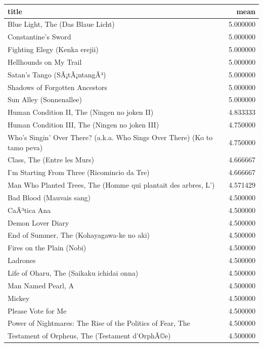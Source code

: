\documentclass[
]{article}
\begin{document}
\begin{table}
\centering\begingroup\fontsize{10}{12}\selectfont

\begin{tabular}{l|r}
\hline
title & mean\\
\hline
Blue Light, The (Das Blaue Licht) & 5.000000\\
\hline
Constantine's Sword & 5.000000\\
\hline
Fighting Elegy (Kenka erejii) & 5.000000\\
\hline
Hellhounds on My Trail & 5.000000\\
\hline
Satan's Tango (SÃ¡tÃ¡ntangÃ³) & 5.000000\\
\hline
Shadows of Forgotten Ancestors & 5.000000\\
\hline
Sun Alley (Sonnenallee) & 5.000000\\
\hline
Human Condition II, The (Ningen no joken II) & 4.833333\\
\hline
Human Condition III, The (Ningen no joken III) & 4.750000\\
\hline
Who's Singin' Over There? (a.k.a. Who Sings Over There) (Ko to tamo peva) & 4.750000\\
\hline
Class, The (Entre les Murs) & 4.666667\\
\hline
I'm Starting From Three (Ricomincio da Tre) & 4.666667\\
\hline
Man Who Planted Trees, The (Homme qui plantait des arbres, L') & 4.571429\\
\hline
Bad Blood (Mauvais sang) & 4.500000\\
\hline
CaÃ³tica Ana & 4.500000\\
\hline
Demon Lover Diary & 4.500000\\
\hline
End of Summer, The (Kohayagawa-ke no aki) & 4.500000\\
\hline
Fires on the Plain (Nobi) & 4.500000\\
\hline
Ladrones & 4.500000\\
\hline
Life of Oharu, The (Saikaku ichidai onna) & 4.500000\\
\hline
Man Named Pearl, A & 4.500000\\
\hline
Mickey & 4.500000\\
\hline
Please Vote for Me & 4.500000\\
\hline
Power of Nightmares: The Rise of the Politics of Fear, The & 4.500000\\
\hline
Testament of Orpheus, The (Testament d'OrphÃ©e) & 4.500000\\
\hline
\end{tabular}
\endgroup{}
\end{table}
\end{document}

